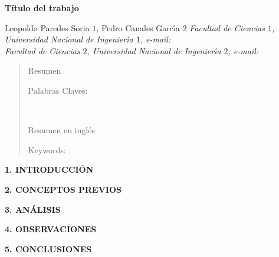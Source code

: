 \documentclass[10pt,a4paper]{article}
\begin{document}
\begin{center}
 {\Large \textbf{T\'itulo del trabajo }}
\end{center}
\begin{center}
 Leopoldo Paredes Soria $1$, Pedro Canales Garc\'{\i}a $2$\vskip12pt
{\it Facultad de Ciencias $1$, Universidad Nacional de Ingenier\'{\i}a $1$, e-mail: \\
Facultad de Ciencias $2$, Universidad Nacional de Ingenier\'{\i}a $2$, e-mail:  }
\end{center}
\begin{quotation}
{\small
\begin{center}
Resumen	
\end{center}

Palabras Claves:  
}\\
{\small
\hspace*{0.5cm}
\begin{center}
Resumen en ingl\'es
\end{center}

Keywords: \\ 
}
\end{quotation}
\begin{multicols}{2}
\begin{center}
{\large \bf 1. INTRODUCCI\'ON}
\end{center}

\begin{center}
{\large \bf 2. CONCEPTOS PREVIOS}
\end{center}

\begin{center}
{\large \bf 3. AN\'ALISIS}
\end{center}

\begin{center}
{\large \bf 4. OBSERVACIONES}
\end{center}

\begin{center}
{\large \bf 5. CONCLUSIONES}
\end{center}


\end{multicols}
\end{document}

